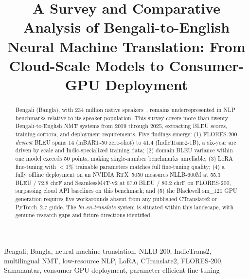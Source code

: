 \documentclass[conference]{IEEEtran}
\begin{document}

\title{A Survey and Comparative Analysis of Bengali-to-English Neural
Machine Translation: From Cloud-Scale Models to Consumer-GPU Deployment}

\author{%
}

\maketitle

\begin{abstract}
Bengali (Bangla), with 234 million native speakers~\cite{ethnologue2023},
remains underrepresented in NLP benchmarks relative to its speaker population.
This survey covers more than twenty Bengali-to-English NMT systems from 2019
through 2025, extracting BLEU scores, training corpora, and deployment requirements.
Five findings emerge: (1) FLORES-200 \textit{devtest} BLEU spans 14 (mBART-50
zero-shot) to 41.4 (IndicTrans2-1B), a six-year arc driven by scale and
Indic-specialized training data; (2) domain BLEU variance within one model
exceeds 50 points, making single-number benchmarks unreliable; (3) LoRA
fine-tuning with $<$1\% trainable parameters matches full fine-tuning quality;
(4) a fully offline deployment on an NVIDIA RTX~5050 measures NLLB-600M at
55.3 BLEU / 72.8 chrF and SeamlessM4T-v2 at 67.0 BLEU / 80.2 chrF on FLORES-200,
surpassing cloud API baselines on this benchmark; and (5) the Blackwell sm\_120
GPU generation requires five workarounds absent from any published CTranslate2
or PyTorch~2.7 guide.
The \textit{bn-en-translate} system is situated within this landscape, with
genuine research gaps and future directions identified.
\end{abstract}

\begin{IEEEkeywords}
Bengali, Bangla, neural machine translation, NLLB-200, IndicTrans2,
multilingual NMT, low-resource NLP, LoRA, CTranslate2, FLORES-200,
Samanantar, consumer GPU deployment, parameter-efficient fine-tuning
\end{IEEEkeywords}

\end{document}
